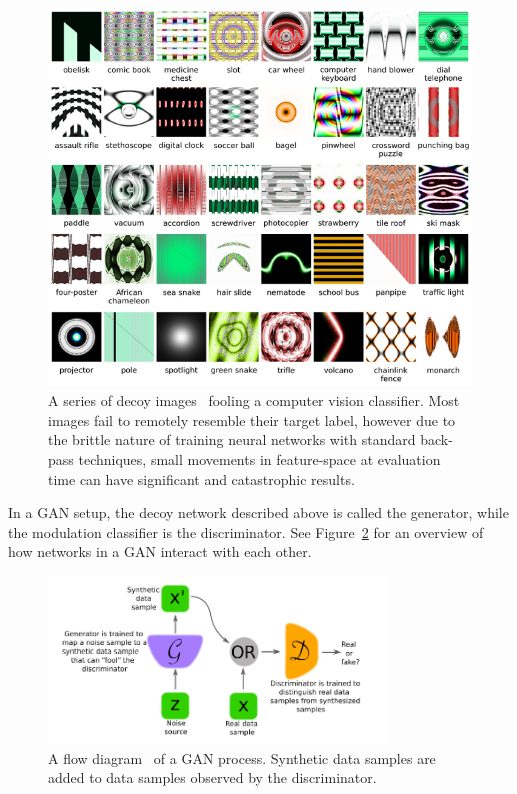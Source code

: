\FloatBarrier
\begin{figure}[ht!]
	\centering	\includegraphics[width=1\textwidth,keepaspectratio]{figs/diversity_40_images_label.png}
    \caption{A series of decoy images~\cite{fooled} fooling a computer vision classifier. Most images fail to remotely resemble their target label, however due to the brittle nature of training neural networks with standard back-pass techniques, small movements in feature-space at evaluation time can have significant and catastrophic results.}
\label{fig:fooled}      
\end{figure}
\FloatBarrier

In a GAN setup, the decoy network described above is called the generator, while the modulation classifier is the discriminator. See Figure~\ref{fig:gan} for an overview of how networks in a GAN interact with each other.

\begin{figure}[ht!]
	\centering	\includegraphics[width=0.8\textwidth,keepaspectratio]{figs/gan.png}
    \caption{A flow diagram~\cite{gan} of a GAN process. Synthetic data samples are added to data samples observed by the discriminator.}
\label{fig:gan}      
\end{figure}

